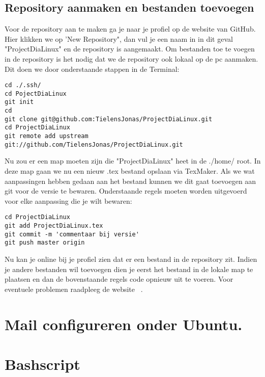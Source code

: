 \documentclass[11pt]{report}
\begin{document}
\section{Repository aanmaken en bestanden toevoegen}
Voor de repository aan te maken ga je naar je profiel op de website van GitHub. Hier klikken we op 'New Repository", dan vul je een naam in in dit geval "ProjectDiaLinux" en de repository is aangemaakt.
Om bestanden toe te voegen in de repository is het nodig dat we de repository ook lokaal op de pc aanmaken. Dit doen we door onderstaande stappen in de Terminal:
\begin{lstlisting}
cd ./.ssh/
cd PojectDiaLinux
git init
cd
git clone git@github.com:TielensJonas/ProjectDiaLinux.git
cd ProjectDiaLinux
git remote add upstream git://github.com/TielensJonas/ProjectDiaLinux.git
\end{lstlisting}
Nu zou er een map moeten zijn die "ProjectDiaLinux" heet in de ./home/ root. In deze map gaan we nu een nieuw .tex bestand opslaan via TexMaker.
Als we wat aanpassingen hebben gedaan aan het bestand kunnen we dit gaat toevoegen aan git voor de versie te bewaren. 
Onderstaande regels moeten worden uitgevoerd voor elke aanpassing die je wilt bewaren:
\begin{lstlisting}
cd ProjectDiaLinux
git add ProjectDiaLinux.tex
git commit -m 'commentaar bij versie'
git push master origin
\end{lstlisting}
Nu kan je online bij je profiel zien dat er een bestand in de repository zit. Indien je andere bestanden wil toevoegen dien je eerst het bestand in de lokale map te plaatsen en dan de bovenstaande regels code opnieuw uit te voeren.
Voor eventuele problemen raadpleeg de website ~\cite{SiteGit}.
\newpage
\renewcommand{\appendixname}{Bijlage}
\chapter{Mail configureren onder Ubuntu.}
\newpage
\renewcommand{\appendixname}{Bijlage}
\chapter{Bashscript}
\newpage
\listoffigures
\listoftables
 

\end{document}
